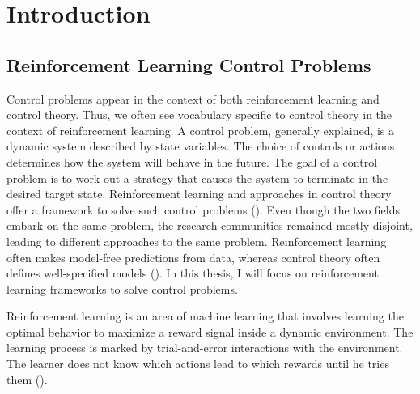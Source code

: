 
\chapter{Introduction}
\label{ch:introduction} 


\section{Reinforcement Learning Control Problems}
Control problems appear in the context of both reinforcement learning and control theory. Thus, we often see vocabulary specific to control theory in the context of reinforcement learning. A control problem, generally explained, is a dynamic system described by state variables. The choice of controls or actions determines how the system will behave in the future. The goal of a control problem is to work out a strategy that causes the system to terminate in the desired target state. Reinforcement learning and approaches in control theory offer a framework to solve such control problems (\cite{bucsoniu2018reinforcement}). Even though the two fields embark on the same problem, the research communities remained mostly disjoint, leading to different approaches to the same problem. Reinforcement learning often makes model-free predictions from data, whereas control theory often defines well-specified models (\cite{recht2018tour}). In this thesis, I will focus on reinforcement learning frameworks to solve control problems.

Reinforcement learning is an area of machine learning that involves learning the optimal behavior to maximize a reward signal inside a dynamic environment. The learning process is marked by trial-and-error interactions with the environment. The learner does not know which actions lead to which rewards until he tries them (\cite{kaelbling1996reinforcement}).

